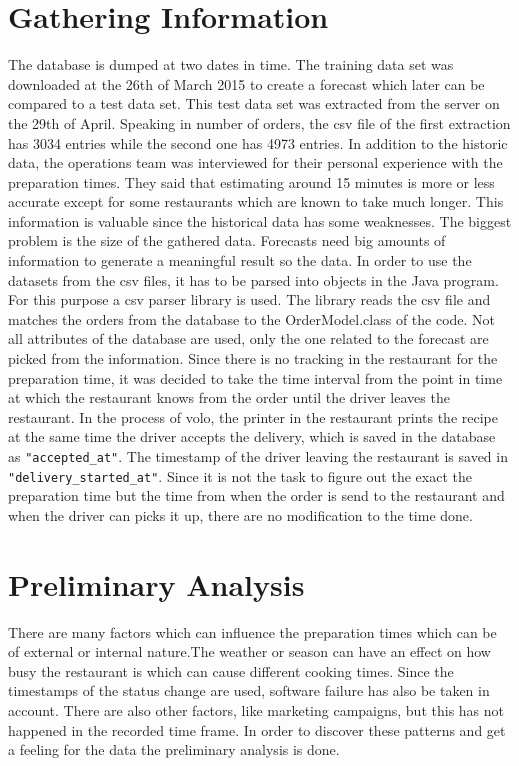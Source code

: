 \section{Gathering Information}\label{section:Gathering Information}
The database is dumped at two dates in time. The training data set was downloaded at the 26th of March 2015 to create a forecast which later can be compared to a test data set. This test data set was extracted from the server on the 29th of April. Speaking in number of orders, the csv file of the first extraction has 3034 entries while the second one has 4973 entries. In addition to the historic data, the operations team was interviewed for their personal experience with the preparation times. They said that estimating around 15 minutes is more or less accurate except for some restaurants which are known to take much longer.\newline
This information is valuable since the historical data has some weaknesses. The biggest problem is the size of the gathered data. Forecasts need big amounts of information to generate a meaningful result so the data.\newline
In order to use the datasets from the csv files, it has to be parsed into objects in the Java program. For this purpose a csv parser library is used. The library reads the csv file and matches the orders from the database to the OrderModel.class of the code. Not all attributes of the database are used, only the one related to the forecast are picked from the information. Since there is no tracking in the restaurant for the preparation time, it was decided to take the time interval from the point in time at which the restaurant knows from the order until the driver leaves the restaurant. In the process of volo, the printer in the restaurant prints the recipe at the same time the driver accepts the delivery, which is saved in the database as \texttt{"accepted\_at"}. The timestamp of the driver leaving the restaurant is saved in \texttt{"delivery\_started\_at"}. Since it is not the task to figure out the exact the preparation time but the time from when the order is send to the restaurant and when the driver can picks it up, there are no modification to the time done.
\section{Preliminary Analysis}\label{section:Preliminary Analysis}
There are many factors which can influence the preparation times which can be of external or internal nature.The weather or season can have an effect on how busy the restaurant is which can cause different cooking times. Since the timestamps of the status change are used, software failure has also be taken in account. There are also other factors, like marketing campaigns, but this has not happened in the recorded time frame. In order to discover these patterns and get a feeling for the data the preliminary analysis is done.
